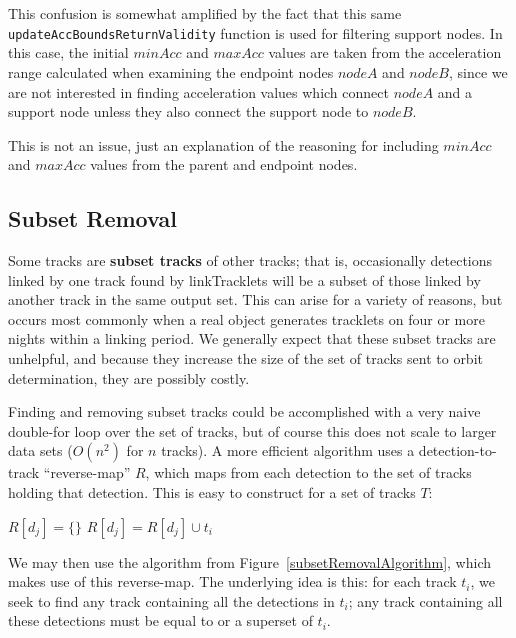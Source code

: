 This confusion is somewhat amplified by the fact that this same {\tt
  updateAccBoundsReturnValidity} function is used for filtering
support nodes.  In this case, the initial $minAcc$ and $maxAcc$ values
are taken from the acceleration range calculated when examining the
endpoint nodes $nodeA$ and $nodeB$, since we are not interested in
finding acceleration values which connect $nodeA$ and a support node
unless they also connect the support node to $nodeB$.

This is not an issue, just an explanation of the reasoning for
including $minAcc$ and $maxAcc$ values from the parent and endpoint
nodes. 





\subsection{Subset Removal}
\label{subsetRemoval}

Some tracks are {\bf subset tracks} of other tracks; that is,
occasionally detections linked by one track found by linkTracklets
will be a subset of those linked by another track in the same output
set.  This can arise for a variety of reasons, but occurs most
commonly when a real object generates tracklets on four or more nights
within a linking period. We generally expect that these subset tracks
are unhelpful, and because they increase the size of the set of tracks
sent to orbit determination, they are possibly costly.

Finding and removing subset tracks could be accomplished with a very
naive double-for loop over the set of tracks, but of course this does
not scale to larger data sets ($O(n^2)$ for $n$ tracks).  A more
efficient algorithm uses a detection-to-track ``reverse-map'' $R$,
which maps from each detection to the set of tracks holding that
detection.  This is easy to construct for a set of tracks $T$:

\hrulefill
\begin{algorithmic}[5]
  \State $R[d_j] = \{\}$
  \EndFor
  \State $R[d_j] = R[d_j] \cup t_i$
  \EndFor
\end{algorithmic}
\hrulefill

We may then use the algorithm from
Figure~\ref{subsetRemovalAlgorithm}, which makes use of this
reverse-map.  The underlying idea is this: for each track $t_i$, we
seek to find any track containing all the detections in $t_i$; any
track containing all these detections must be equal to or a superset
of $t_i$.

